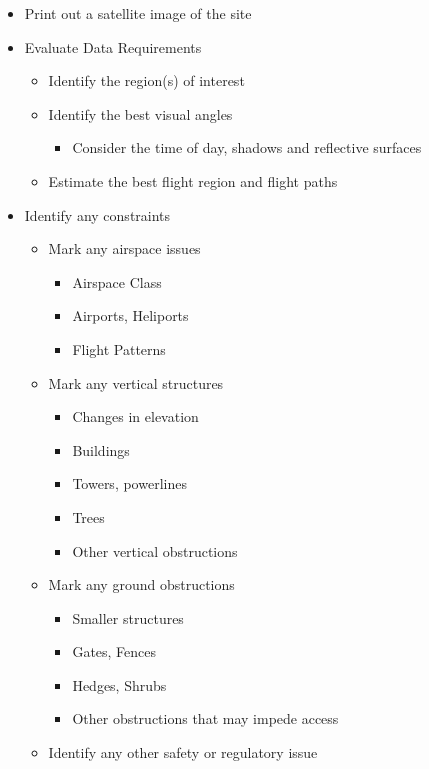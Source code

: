 \documentclass[
  12pt,
]{book}
\providecommand{\tightlist}{%
  \setlength{\itemsep}{0pt}\setlength{\parskip}{0pt}}
\begin{document}
\begin{itemize}
\tightlist
\item
  Print out a satellite image of the site
\item
  Evaluate Data Requirements

  \begin{itemize}
  \tightlist
  \item
    Identify the region(s) of interest
  \item
    Identify the best visual angles

    \begin{itemize}
    \tightlist
    \item
      Consider the time of day, shadows and reflective surfaces
    \end{itemize}
  \item
    Estimate the best flight region and flight paths
  \end{itemize}
\item
  Identify any constraints

  \begin{itemize}
  \tightlist
  \item
    Mark any airspace issues

    \begin{itemize}
    \tightlist
    \item
      Airspace Class
    \item
      Airports, Heliports
    \item
      Flight Patterns
    \end{itemize}
  \item
    Mark any vertical structures

    \begin{itemize}
    \tightlist
    \item
      Changes in elevation
    \item
      Buildings
    \item
      Towers, powerlines
    \item
      Trees
    \item
      Other vertical obstructions
    \end{itemize}
  \item
    Mark any ground obstructions

    \begin{itemize}
    \tightlist
    \item
      Smaller structures
    \item
      Gates, Fences
    \item
      Hedges, Shrubs
    \item
      Other obstructions that may impede access
    \end{itemize}
  \item
    Identify any other safety or regulatory issue


\end{itemize}
\end{itemize}
\end{document}
